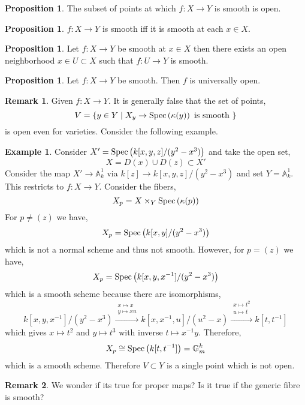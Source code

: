 \documentclass[12pt]{extarticle}
\theoremstyle{definition}
\newtheorem{proposition}[theorem]{Proposition}
\newtheorem{example}[theorem]{Example}
\newtheorem{remark}{Remark}
\begin{document}
\begin{proposition}
The subset of points at which $f : X \to Y$ is smooth is open.
\end{proposition}

\begin{proposition}
$f : X \to Y$ is smooth iff it is smooth at each $x \in X$.
\end{proposition}


\begin{proposition}
Let $f : X  \to Y$ be smooth at $x \in X$ then there exists an open neighborhood $x \in U \subset X$ such that $f : U \to Y$ is smooth.
\end{proposition}

\begin{proposition}
Let $f : X \to Y$ be smooth. Then $f$ is universally open. 
\end{proposition}


\begin{remark}
Given $f : X \to Y$. It is generally false that the set of points, 
\[ V = \{ y \in Y \mid X_y \to \mathrm{Spec}\left(\kappa(y)\right) \text{ is smooth } \} \]
is open even for varieties. Consider the following example.
\end{remark}

\begin{example}
Consider $X' = \mathrm{Spec}\left(k[x,y,z]/(y^2 - x^3)\right)$ and take the open set,
\[ X = D(x) \cup D(z) \subset X' \]
Consider the map $X' \to \mathbb{A}^1_k$ via $k[z] \to k[x,y,z]/(y^2 - x^3)$ and set $Y = \mathbb{A}^1_k$. This restricts to $f : X \to Y$. Consider the fibers, 
\[ X_p = X \times_Y \mathrm{Spec}\left(\kappa(p)\right) \] 
For $p \neq (z)$ we have,
\[ X_p = \mathrm{Spec}\left(k[x,y]/(y^2 - x^3)\right) \]
which is not a normal scheme and thus not smooth.
However, for $p = (z)$ we have, 
\[ X_p = \mathrm{Spec}\left(k[x,y, x^{-1}]/(y^2 - x^3)\right) \]
which is a smooth scheme because there are isomorphisms,
\[ k[x, y, x^{-1}] / (y^2 - x^3) \xrightarrow{\substack{x \mapsto x \\ y \mapsto xu }} k[x,x^{-1}, u]/(u^2 - x) \xrightarrow{\substack{x \mapsto t^2 \\ u \mapsto t}} k[t, t^{-1}] \]
which gives $x \mapsto t^2$ and $y \mapsto t^3$ with inverse $t \mapsto x^{-1} y$. Therefore,
\[ X_p \cong \mathrm{Spec}\left(k[t, t^{-1}]\right) = \mathbb{G}_m^k \] 
which is a smooth scheme. 
Therefore $V \subset Y$ is a single point which is not open. 
\end{example}

\begin{remark}
We wonder if its true for proper maps? Is it true if the generic fibre is smooth?
\end{remark}
\end{document}

